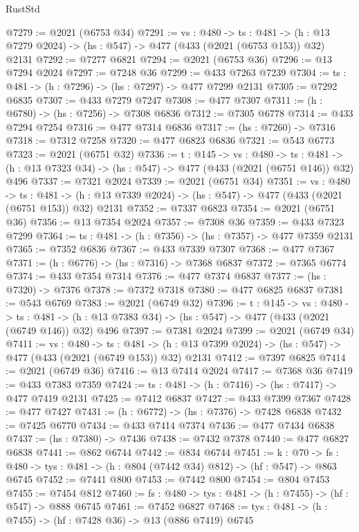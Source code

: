 \begin{lexlean}{RustStd}
\begin{coremodule}
@7279 := @2021 (@6753 @34)
@7291 := {vs : @480} ->
  {ts : @481} -> (h : @13 @7279 @2024) -> (hs : @547) -> @477 (@433 (@2021 (@6753 @153)) @32) @2131
@7292 := @7277 @6821
@7294 := @2021 (@6753 @36)
@7296 := @13 @7294 @2024
@7297 := @7248 @36
@7299 := @433 @7263 @7239
@7304 := {ts : @481} -> (h : @7296) -> (hs : @7297) -> @477 @7299 @2131
@7305 := @7292 @6835
@7307 := @433 @7279 @7247
@7308 := @477 @7307
@7311 := (h : @6780) -> (hs : @7256) -> @7308 @6836
@7312 := @7305 @6778
@7314 := @433 @7294 @7254
@7316 := @477 @7314 @6836
@7317 := (hs : @7260) -> @7316
@7318 := @7312 @7258
@7320 := @477 @6823 @6836
@7321 := @543 @6773
@7323 := @2021 (@6751 @32)
@7336 := {t : @145} ->
  {vs : @480} ->
  {ts : @481} -> (h : @13 @7323 @34) -> (hs : @547) -> @477 (@433 (@2021 (@6751 @146)) @32) @496
@7337 := @7321 @2024
@7339 := @2021 (@6751 @34)
@7351 := {vs : @480} ->
  {ts : @481} -> (h : @13 @7339 @2024) -> (hs : @547) -> @477 (@433 (@2021 (@6751 @153)) @32) @2131
@7352 := @7337 @6823
@7354 := @2021 (@6751 @36)
@7356 := @13 @7354 @2024
@7357 := @7308 @36
@7359 := @433 @7323 @7299
@7364 := {ts : @481} -> (h : @7356) -> (hs : @7357) -> @477 @7359 @2131
@7365 := @7352 @6836
@7367 := @433 @7339 @7307
@7368 := @477 @7367
@7371 := (h : @6776) -> (hs : @7316) -> @7368 @6837
@7372 := @7365 @6774
@7374 := @433 @7354 @7314
@7376 := @477 @7374 @6837
@7377 := (hs : @7320) -> @7376
@7378 := @7372 @7318
@7380 := @477 @6825 @6837
@7381 := @543 @6769
@7383 := @2021 (@6749 @32)
@7396 := {t : @145} ->
  {vs : @480} ->
  {ts : @481} -> (h : @13 @7383 @34) -> (hs : @547) -> @477 (@433 (@2021 (@6749 @146)) @32) @496
@7397 := @7381 @2024
@7399 := @2021 (@6749 @34)
@7411 := {vs : @480} ->
  {ts : @481} -> (h : @13 @7399 @2024) -> (hs : @547) -> @477 (@433 (@2021 (@6749 @153)) @32) @2131
@7412 := @7397 @6825
@7414 := @2021 (@6749 @36)
@7416 := @13 @7414 @2024
@7417 := @7368 @36
@7419 := @433 @7383 @7359
@7424 := {ts : @481} -> (h : @7416) -> (hs : @7417) -> @477 @7419 @2131
@7425 := @7412 @6837
@7427 := @433 @7399 @7367
@7428 := @477 @7427
@7431 := (h : @6772) -> (hs : @7376) -> @7428 @6838
@7432 := @7425 @6770
@7434 := @433 @7414 @7374
@7436 := @477 @7434 @6838
@7437 := (hs : @7380) -> @7436
@7438 := @7432 @7378
@7440 := @477 @6827 @6838
@7441 := @862 @6744
@7442 := @834 @6744
@7451 := {k : @70} ->
  {fs : @480} -> {tys : @481} -> (h : @804 (@7442 @34) @812) -> (hf : @547) -> @863 @6745
@7452 := @7441 @800
@7453 := @7442 @800
@7454 := @804 @7453
@7455 := @7454 @812
@7460 := {fs : @480} -> {tys : @481} -> (h : @7455) -> (hf : @547) -> @888 @6745
@7461 := @7452 @6827
@7468 := {tys : @481} -> (h : @7455) -> (hf : @7428 @36) -> @13 (@886 @7419) @6745

\end{coremodule}
\end{lexlean}
